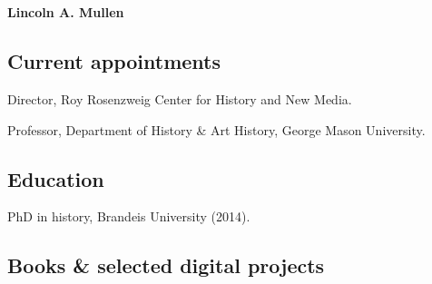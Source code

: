 \documentclass[11pt]{article}
\begin{document}
\thispagestyle{fancy}
\fancyfoot{}
\fancyhead{}
\renewcommand{\headrulewidth}{0pt}

\hfill\hfill\hfill
\hfill\hfill\hfill
\hfill\hfill\hfill
\hfill\hfill\hfill
\begin{minipage}[t]{2.2in}
   \\
   \\
\end{minipage}
\hfill
\begin{minipage}[t]{3.0in}
\end{minipage}

\vspace{0.4in}

{\Large\sffamily\bfseries Lincoln A. Mullen}\\[-0.1in]


\subsection{Current appointments}\label{Appointments}

Director, Roy Rosenzweig Center for History and New Media.

Professor, Department of History \& Art History, George Mason University.

\subsection{Education}\label{education}

PhD in history, Brandeis University (2014). 

\subsection{Books \& selected digital projects}\label{books}
\end{document}
